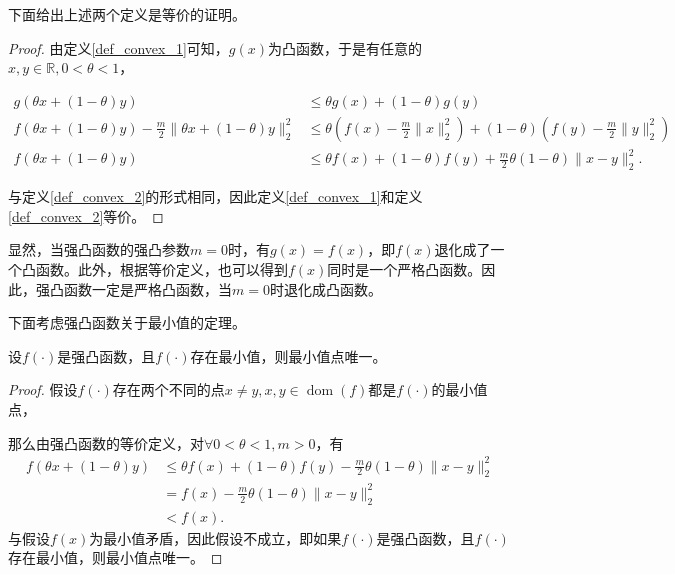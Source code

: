 下面给出上述两个定义是等价的证明。
\begin{proof}
    由定义\ref{def_convex_1}可知，$g(x)$为凸函数，于是有任意的$x, y\in \mathbb{R}, 0<\theta<1$，

    \begin{equation*}
        \begin{split}
            g(\theta x + (1-\theta)y) &\leq \theta g(x) + (1-\theta) g(y) \\
            f(\theta x + (1-\theta)y) - \frac{m}{2}\|\theta x+(1-\theta)y\|_{2}^{2} &\leq \theta(f(x)-\frac{m}{2}\|x\|_{2}^{2}) + (1-\theta) (f(y)-\frac{m}{2}\|y\|_{2}^{2}) \\
            f(\theta x + (1-\theta)y) &\leq \theta f(x) + (1-\theta) f(y) + \frac{m}{2}\theta(1-\theta)\|x-y\|_{2}^{2}.
        \end{split}
    \end{equation*}

    与定义\ref{def_convex_2}的形式相同，因此定义\ref{def_convex_1}和定义\ref{def_convex_2}等价。
\end{proof}

显然，当强凸函数的强凸参数$m=0$时，有$g(x)=f(x)$，即$f(x)$退化成了一个凸函数。此外，根据等价定义，也可以得到$f(x)$同时是一个严格凸函数。因此，强凸函数一定是严格凸函数，当$m=0$时退化成凸函数。

下面考虑强凸函数关于最小值的定理。

\begin{theorem}
    设$f(\cdot)$是强凸函数，且$f(\cdot)$存在最小值，则最小值点唯一。
\end{theorem}
\begin{proof}
    假设$f(\cdot)$存在两个不同的点$x\neq y, x, y\in \mathop{\mathrm{dom}} (f)$都是$f(\cdot)$的最小值点，

    那么由强凸函数的等价定义，对$\forall 0<\theta<1, m>0$，有
    \begin{equation*}
        \begin{split}
            f(\theta x + (1-\theta)y) &\leq \theta f(x) + (1-\theta)f(y) - \frac{m}{2}\theta(1-\theta)\|x-y\|_{2}^{2} \\
            &= f(x) - \frac{m}{2}\theta(1-\theta)\|x-y\|_{2}^{2} \\
            &< f(x).
        \end{split}
    \end{equation*}
    与假设$f(x)$为最小值矛盾，因此假设不成立，即如果$f(\cdot)$是强凸函数，且$f(\cdot)$存在最小值，则最小值点唯一。
\end{proof}

